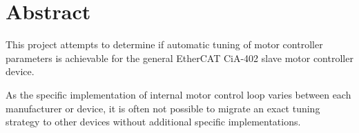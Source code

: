 \section{Abstract}

This project attempts to determine if automatic tuning of motor controller parameters is achievable for the general EtherCAT CiA-402 slave motor controller device. 

As the specific implementation of internal motor control loop varies between each manufacturer or device, it is often not possible to migrate an exact tuning strategy to other devices without additional specific implementations.

